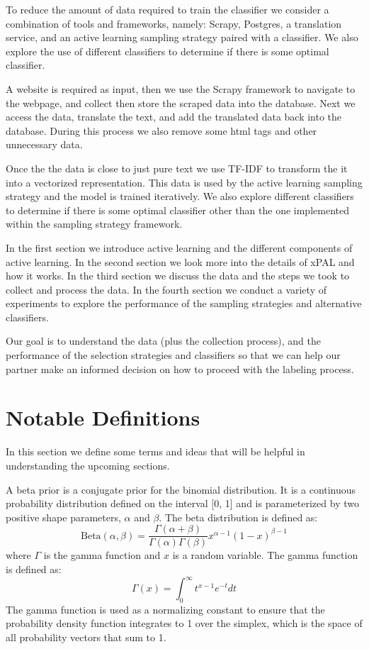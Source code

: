 To reduce the amount of data required to train the classifier we consider a combination of tools and frameworks, namely: Scrapy, Postgres, a translation service, and an active learning sampling strategy paired with a classifier. We also explore the use of different classifiers to determine if there is some optimal classifier.

A website is required as input, then we use the Scrapy framework to navigate to the webpage, and collect then store the scraped data into the database. Next we access the data, translate the text, and add the translated data back into the database. During this process we also remove some html tags and other unnecessary data.

Once the the data is close to just pure text we use TF-IDF to transform the it into a vectorized representation. This data is used by the active learning sampling strategy and the model is trained iteratively. We also explore different classifiers to determine if there is some optimal classifier other than the one implemented within the sampling strategy framework.

In the first section we introduce active learning and the different components of active learning. In the second section we look more into the details of xPAL and how it works. In the third section we discuss the data and the steps we took to collect and process the data. In the fourth section we conduct a variety of experiments to explore the performance of the sampling strategies and alternative classifiers. 

Our goal is to understand the data (plus the collection process), and the performance of the selection strategies and classifiers so that we can help our partner make an informed decision on how to proceed with the labeling process.

\section*{Notable Definitions}

In this section we define some terms and ideas that will be helpful in understanding the upcoming sections.

\begin{defn}
\label{def:beta_prior}
A beta prior is a conjugate prior for the binomial distribution. It is a continuous probability distribution defined on the interval [0, 1] and is parameterized by two positive shape parameters, \(\alpha\) and \(\beta\). The beta distribution is defined as: 
\[\text{Beta}(\alpha, \beta) = \frac{\Gamma(\alpha + \beta)}{\Gamma(\alpha)\Gamma(\beta)}x^{\alpha - 1}(1 - x)^{\beta - 1}\]
where \(\Gamma\) is the gamma function and \(x\) is a random variable. The gamma function is defined as:
\[\Gamma(x) = \int_0^\infty t^{x - 1}e^{-t}dt\]
The gamma function is used as a normalizing constant to ensure that the probability density function integrates to 1 over the simplex, which is the space of all probability vectors that sum to 1.
\end{defn}

